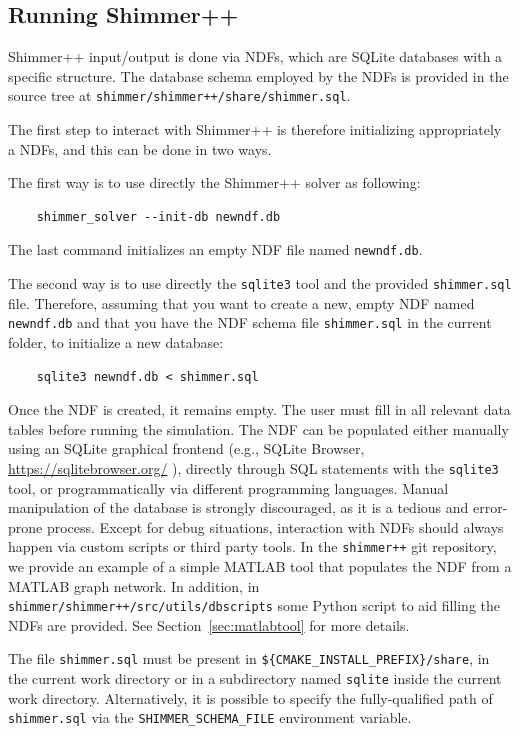 \subsection{Running Shimmer++}
Shimmer++ input/output is done via NDFs, which are SQLite databases with a specific structure. The database schema employed by the NDFs is provided in the source tree at \texttt{shimmer/shimmer++/share/shimmer.sql}.

The first step to interact with Shimmer++ is therefore initializing appropriately a NDFs, and this can be done in two ways.

The first way is to use directly the Shimmer++ solver as following:
\begin{verbatim}
    shimmer_solver --init-db newndf.db
\end{verbatim}
The last command initializes an empty NDF file named \texttt{newndf.db}.
\vspace{5mm}

The second way is to use directly the \texttt{sqlite3} tool and the provided \texttt{shimmer.sql} file. Therefore, assuming that you want to create a new, empty NDF named \texttt{newndf.db} and that you have the NDF schema file \texttt{shimmer.sql} in the current folder, to initialize a new database:
\begin{verbatim}
    sqlite3 newndf.db < shimmer.sql
\end{verbatim}

\begin{remark}
Once the NDF is created, it remains empty. The user must fill in all relevant data tables before running the simulation.
The NDF can be populated either manually using an SQLite graphical frontend (e.g., SQLite Browser, \url{https://sqlitebrowser.org/}
), directly through SQL statements with the \texttt{sqlite3} tool, or programmatically via different programming languages. Manual manipulation of the database is strongly discouraged, as it is a tedious and error-prone process. Except for debug situations, interaction with NDFs should always happen via custom scripts or third party tools. 
In the \texttt{shimmer++} git repository, we provide an example of a simple MATLAB tool that populates the NDF from a MATLAB graph network.  In addition, in \texttt{shimmer/shimmer++/src/utils/dbscripts} some Python script to aid filling the NDFs are provided.
See Section~\ref{sec:matlabtool} for more details.
\end{remark}

\begin{remark}
The file \texttt{shimmer.sql} must be present in \texttt{\$\{CMAKE\_INSTALL\_PREFIX\}/share}, in the current work directory or in a subdirectory named \texttt{sqlite} inside the current work directory. Alternatively, it is possible to specify the fully-qualified path of \texttt{shimmer.sql} via the \texttt{SHIMMER\_SCHEMA\_FILE} environment variable.
\end{remark}

